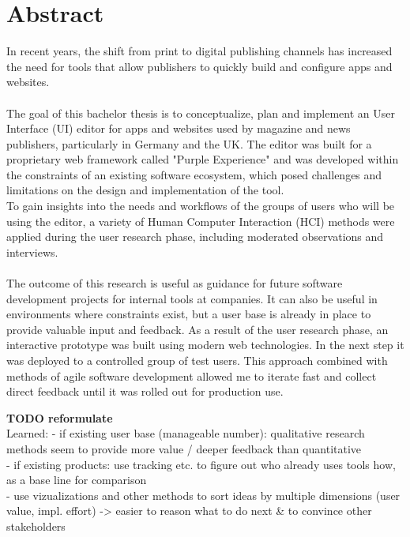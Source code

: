 %

\chapter{Abstract}

In recent years, the shift from print to digital publishing channels has increased the need for tools that allow publishers to quickly build and configure apps and websites.
\\\\
The goal of this bachelor thesis is to conceptualize, plan and implement an User Interface (UI) editor for apps and websites used by magazine and news publishers, particularly in Germany and the UK.
The editor was built for a proprietary web framework called "Purple Experience" and was developed within the constraints of an existing software ecosystem, which posed challenges and limitations on the design and implementation of the tool.
\\
To gain insights into the needs and workflows of the groups of users who will be using the editor, a variety of Human Computer Interaction (HCI) methods were applied during the user research phase, including moderated observations and interviews. 
\\\\
The outcome of this research is useful as guidance for future software development projects for internal tools at companies. It can also be useful in environments where constraints exist, but a user base is already in place to provide valuable input and feedback.
As a result of the user research phase, an interactive prototype was built using modern web technologies.
In the next step it was deployed to a controlled group of test users.
This approach combined with methods of agile software development allowed me to iterate fast and collect direct feedback until it was rolled out for production use.

\textbf{TODO reformulate}
\\
Learned: 
- if existing user base (manageable number): qualitative research methods seem to provide more value / deeper feedback than quantitative
\\
- if existing products: use tracking etc. to figure out who already uses tools how, as a base line for comparison
\\
- use vizualizations and other methods to sort ideas by multiple dimensions (user value, impl. effort) -> easier to reason what to do next \& to convince other stakeholders